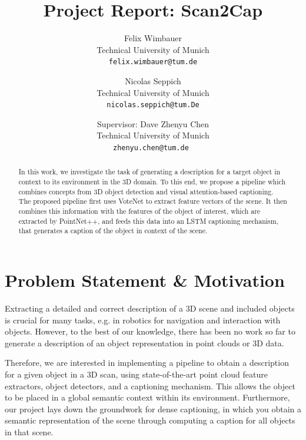 \documentclass[10pt,twocolumn,letterpaper]{article}
\begin{document}
\title{Project Report: Scan2Cap}

\author{Felix Wimbauer\\
Technical University of Munich\\
{\tt\small felix.wimbauer@tum.de}
\and
Nicolas Seppich\\
Technical University of Munich\\
{\tt\small nicolas.seppich@tum.De}
\and
\small
Supervisor: Dave Zhenyu Chen\\
\small
Technical University of Munich\\
{\tt\small zhenyu.chen@tum.de }
}

\maketitle

\begin{abstract}
In this work, we investigate the task of generating a description for a target object in context to its environment in the 3D domain. To this end, we propose a pipeline which combines concepts from 3D object detection and visual attention-based captioning. The proposed pipeline first uses VoteNet to extract feature vectors of the scene. It then combines this information with the features of the object of interest, which are extracted by PointNet++, and feeds this data into an LSTM captioning mechanism, that generates a caption of the object in context of the scene.
   
\end{abstract}

\section{Problem Statement \& Motivation}

Extracting a detailed and correct description of a 3D scene and included objects is crucial for many tasks, e.g. in robotics for navigation and interaction with objects.
However, to the best of our knowledge, there has been no work so far to generate a description of an object representation in point clouds or 3D data.

Therefore, we are interested in implementing a pipeline to obtain a description for a given object in a 3D scan, using state-of-the-art point cloud feature extractors, object detectors, and a captioning mechanism. This allows the object to be placed in a global semantic context within its environment. Furthermore, our project lays down the groundwork for dense captioning, in which you obtain a semantic representation of the scene through computing a caption for all objects in that scene.
 
\end{document}
